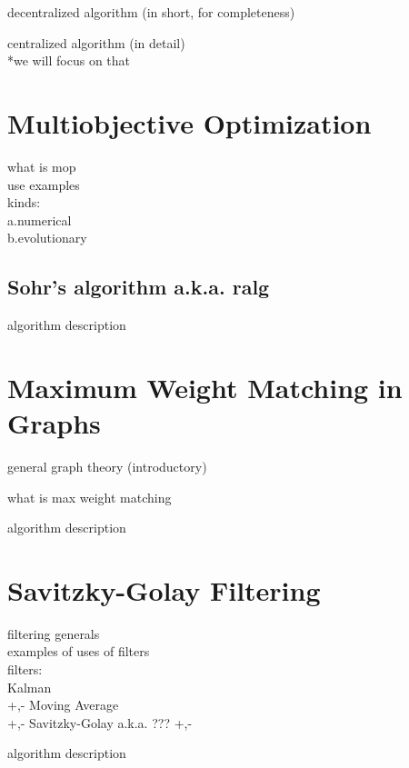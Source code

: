 decentralized algorithm (in short, for completeness)

centralized algorithm (in detail)\\
*we will focus on that


\section{Multiobjective Optimization} \label{sec:theorBack-MOP}

what is mop\\
use examples\\
kinds:\\
	a.numerical\\
	b.evolutionary

\subsection{Sohr's algorithm a.k.a. ralg} \label{subsec:theorBack-MOP-minimax}

algorithm description

\section{Maximum Weight Matching in Graphs} \label{sec:theorBack-MWMGraphs}

general graph theory (introductory)

what is max weight matching

algorithm description

\section{Savitzky-Golay Filtering} \label{sec:theorBack-SavitzkyGolay}

filtering generals\\
examples of uses of filters\\
filters:\\
	Kalman\\
		+,-
	Moving Average\\
		+,-
	Savitzky-Golay a.k.a. ???
		+,-

algorithm description
